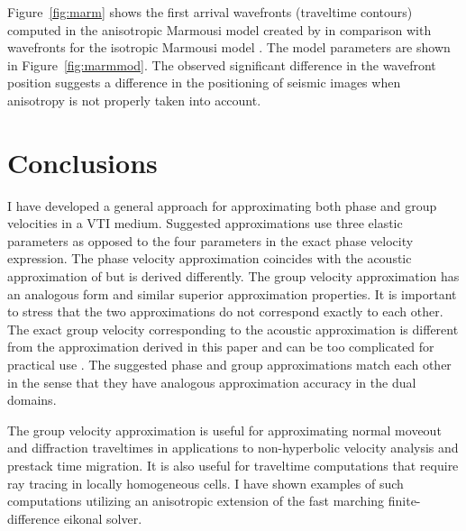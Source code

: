 
Figure~\ref{fig:marm} shows the first arrival wavefronts (traveltime contours)
computed in the ani\-so\-tro\-pic Marmousi model created by
\cite{Alkhalifah.sep.95.tariq3} in comparison with wavefronts for the
isotropic Marmousi model \cite[]{TLE13-09-09270936,TME00-00-00010194}. The model
parameters are shown in Figure~\ref{fig:marmmod}. The observed significant
difference in the wavefront position suggests a difference in the positioning
of seismic images when anisotropy is not properly taken into account.



\section{Conclusions}

I have developed a general approach for approximating both phase and group
velocities in a VTI medium. Suggested approximations use three elastic
parameters as opposed to the four parameters in the exact phase velocity
expression. The phase velocity approximation coincides with the acoustic
approximation of \cite{GEO63-02-06230631,GEO65-04-12391250} but is derived
differently. The group velocity approximation has an analogous form and
similar superior approximation properties. It is important to stress that the
two approximations do not correspond exactly to each other. The exact group
velocity corresponding to the acoustic approximation is different from the
approximation derived in this paper and can be too complicated for practical
use \cite[]{EAE-1999-1049}. The suggested phase and group approximations match
each other in the sense that they have analogous approximation accuracy in the
dual domains.

The group velocity approximation is useful for approximating normal moveout
and diffraction traveltimes in applications to non-hyperbolic velocity
analysis and prestack time migration. It is also useful for traveltime
computations that require ray tracing in locally homogeneous cells. I have
shown examples of such computations utilizing an anisotropic extension of the
fast marching finite-difference eikonal solver.

